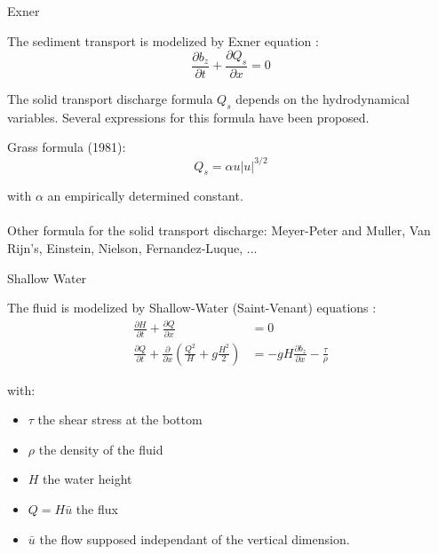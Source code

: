 \begin{frame}{Exner}
  \begin{block}{The sediment transport is modelized by Exner equation :}
    \begin{equation}
      \frac{\partial b_z}{\partial t}+\frac{\partial Q_s}{\partial x}=0
    \end{equation}
  \end{block}
  The solid transport discharge formula $Q_s$ depends on the hydrodynamical variables.
  Several expressions for this formula have been proposed.

  \begin{block}{Grass formula (1981):}
    \begin{equation}
      Q_s = \alpha u | u |^{3/2}
    \end{equation}
  \end{block}
with $\alpha$ an empirically determined constant.\\~\\

Other formula for the solid transport discharge: Meyer-Peter and Muller, Van Rijn's, Einstein, Nielson, Fernandez-Luque, ... 

\end{frame}

\begin{frame}{Shallow Water}
  \begin{block}{The fluid is modelized by Shallow-Water (Saint-Venant) equations :}
    \begin{align*}
      \frac{\partial H}{\partial t}+\frac{\partial Q}{\partial x} &= 0 \\
      \frac{\partial Q}{\partial t} +\frac{\partial}{\partial x}\left(  \frac{Q^2}{H} + g\frac{H^2}{2}\right) &= -gH\frac{\partial b_z} {\partial x} - \frac{\tau}{\rho}
    \end{align*}
  \end{block}
  with:
  \begin{itemize}
  \item
    $\tau$ the shear stress at the bottom
  \item
    $\rho$ the density of the fluid
  \item
    $H$ the water height
  \item
    $Q=H\bar{u}$ the flux
  \item
    $\bar{u}$ the flow supposed independant of the vertical dimension.
  \end{itemize}
\end{frame}

